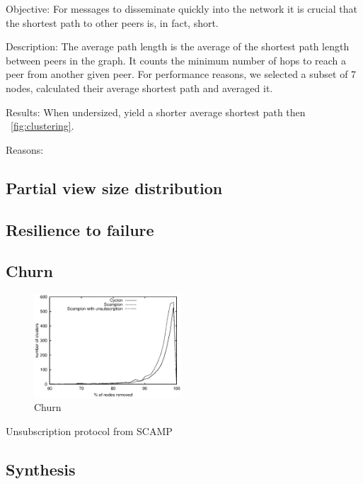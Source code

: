 \begin{asparadesc}
\item[Objective:] 
    For messages to disseminate quickly into the network it is crucial 
    that the shortest path to other peers is, in fact, short.
\item[Description:] The average path length is the average of the shortest path
  length between peers in the graph. It counts the minimum number of hops to
  reach a peer from another given peer.
  For performance reasons, we selected a subset of 7 nodes, calculated their
  average shortest path and averaged it.
\item[Results:]
When undersized, \CYCLON{} yield a shorter average shortest path then \SCAMPLON{}~\ref{fig:clustering}.
\item[Reasons:]
\end{asparadesc}

\subsection{Partial view size distribution}

\subsection{Resilience to failure}

\subsection{Churn}

\begin{figure}
    \centering
    \includegraphics[width=0.49\textwidth]{img/churn.eps}
    \caption{Churn}
    \label{fig:churn}
\end{figure}

\begin{algorithm}

\caption{\label{algo:unsubscription}Unsubscription protocol from
  SCAMP~\cite{ganesh2003peer}}
\end{algorithm}

\subsection{Synthesis}


